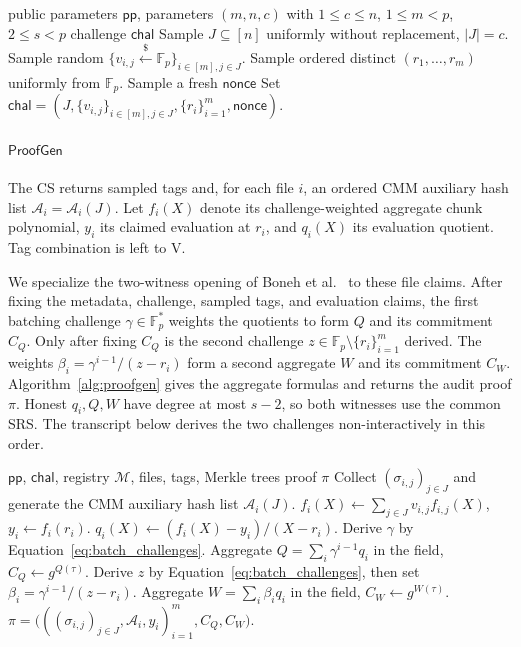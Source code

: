 \documentclass[lettersize,journal]{IEEEtran}
\newcommand{\FF}{\mathbb{F}}
\newcommand{\Chal}{\ensuremath{\mathsf{Challenge}}}
\newcommand{\ProofGen}{\ensuremath{\mathsf{ProofGen}}}
\begin{document}
\begin{algorithm}[h]
\caption{$\Chal$}
\label{alg:chal}
\begin{algorithmic}[1]
\Require public parameters $\mathsf{pp}$, parameters $(m,n,c)$ with $1\leq c\leq n$, $1\leq m<p$, $2\leq s<p$
\Ensure challenge $\mathsf{chal}$
\State Sample $J\subseteq[n]$ uniformly without replacement, $|J|=c$.
\State Sample random $\{v_{i,j} \xleftarrow{\$}\FF_p\}_{i\in[m],j\in J}$.
\State Sample ordered distinct $(r_1,\ldots,r_m)$ uniformly from $\FF_p$.
\State Sample a fresh $\mathsf{nonce}$
\State Set
$
\mathsf{chal}=(J,\{v_{i,j}\}_{i\in[m],j\in J}, \{r_i\}_{i=1}^m, \mathsf{nonce}).
$
\end{algorithmic}
\end{algorithm}

\paragraph{\textbf{\ProofGen{}}}
The CS returns sampled tags and, for each file $i$, an ordered CMM auxiliary hash list $\mathcal A_i=\mathcal A_i(J)$. Let $f_i(X)$ denote its challenge-weighted aggregate chunk polynomial, $y_i$ its claimed evaluation at $r_i$, and $q_i(X)$ its evaluation quotient. Tag combination is left to V.

We specialize the two-witness opening of Boneh et al.~\cite[Sec.~4.1]{Boneh2020PCS} to these file claims. After fixing the metadata, challenge, sampled tags, and evaluation claims, the first batching challenge $\gamma\in\FF_p^*$ weights the quotients to form $Q$ and its commitment $C_Q$. Only after fixing $C_Q$ is the second challenge $z\in\FF_p\setminus\{r_i\}_{i=1}^m$ derived. The weights $\beta_i=\gamma^{i-1}/(z-r_i)$ form a second aggregate $W$ and its commitment $C_W$. Algorithm~\ref{alg:proofgen} gives the aggregate formulas and returns the audit proof $\pi$. Honest $q_i,Q,W$ have degree at most $s-2$, so both witnesses use the common SRS. The transcript below derives the two challenges non-interactively in this order.

\begin{algorithm}[h]
\caption{\textbf{$\ProofGen$}}
\label{alg:proofgen}
\begin{algorithmic}[1]
\Require $\mathsf{pp}$, $\mathsf{chal}$, registry $\mathcal M$, files, tags, Merkle trees
\Ensure proof $\pi$
\State Collect $(\sigma_{i,j})_{j\in J}$ and generate the CMM auxiliary hash list $\mathcal A_i(J)$.
\State $f_i(X)\gets\sum_{j\in J}v_{i,j}f_{i,j}(X)$, $y_i\gets f_i(r_i)$.
\State $q_i(X)\gets(f_i(X)-y_i)/(X-r_i)$.
\EndFor
\State Derive $\gamma$ by Equation~\eqref{eq:batch_challenges}.
\State Aggregate $Q=\sum_i\gamma^{i-1}q_i$ in the field, $C_Q\gets g^{Q(\tau)}$.
\State Derive $z$ by Equation~\eqref{eq:batch_challenges}, then set $\beta_i=\gamma^{i-1}/(z-r_i)$.
\State Aggregate $W=\sum_i\beta_iq_i$ in the field, $C_W\gets g^{W(\tau)}$.
\State \Return $\pi=\bigl(((\sigma_{i,j})_{j\in J},\mathcal A_i,y_i)_{i=1}^m,C_Q,C_W\bigr)$.
\end{algorithmic}
\end{algorithm}
\end{document}

